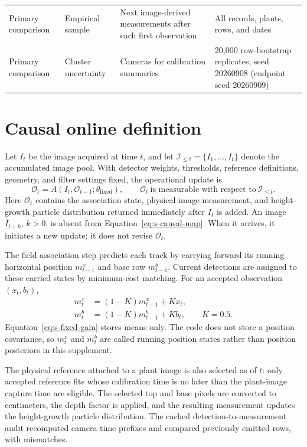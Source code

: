 \documentclass[review,12pt,authoryear]{elsarticle}
\begin{document}
\begin{longtable}{L{2.45cm}L{4.05cm}L{3.25cm}L{3.25cm}}
Primary comparison & Empirical sample & Next image-derived measurements after each first observation & All \FieldN{} records, \FieldPlants{} plants, \FieldRows{} rows, and \FieldDates{} dates \\
Primary comparison & Cluster uncertainty & Cameras for calibration summaries & 20,000 row-bootstrap replicates; seed 20260908 (endpoint seed 20260909) \\
\end{longtable}

\section{Causal online definition}
\label{sec:s-causal}

Let $I_t$ be the image acquired at time $t$, and let $\mathcal I_{\leq t}=\{I_1,\ldots,I_t\}$ denote the accumulated image pool. With detector weights, thresholds, reference definitions, geometry, and filter settings fixed, the operational update is
\begin{equation}
\mathcal O_t=A\!\left(I_t,\mathcal O_{t-1};\theta_{\mathrm{fixed}}\right),
\qquad
\mathcal O_t\ \text{is measurable with respect to}\ \mathcal I_{\leq t}.
\label{eq:s-causal-map}
\end{equation}
Here $\mathcal O_t$ contains the association state, physical image measurement, and height-growth particle distribution returned immediately after $I_t$ is added. An image $I_{t+k}$, $k>0$, is absent from Equation~\ref{eq:s-causal-map}. When it arrives, it initiates a new update; it does not revise $\mathcal O_t$.

The field association step predicts each track by carrying forward its running horizontal position $m^x_{t-1}$ and base row $m^b_{t-1}$. Current detections are assigned to these carried states by minimum-cost matching. For an accepted observation $(x_t,b_t)$,
\begin{align}
m^x_t &= (1-K)m^x_{t-1}+Kx_t,\\
m^b_t &= (1-K)m^b_{t-1}+Kb_t, \qquad K=0.5.
\label{eq:s-fixed-gain}
\end{align}
Equation~\ref{eq:s-fixed-gain} stores means only. The code does not store a position covariance, so $m^x_t$ and $m^b_t$ are called running position states rather than position posteriors in this supplement.

The physical reference attached to a plant image is also selected as of $t$: only accepted reference fits whose calibration time is no later than the plant-image capture time are eligible. The selected top and base pixels are converted to centimeters, the depth factor is applied, and the resulting measurement updates the height-growth particle distribution. The cached detection-to-measurement audit recomputed \CausalPrefixes{} camera-time prefixes and compared \CausalRows{} previously emitted rows, with \CausalMismatches{} mismatches.
\end{document}
